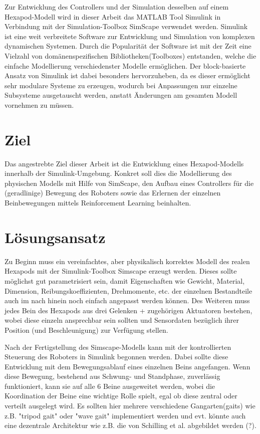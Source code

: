 Zur Entwicklung des Controllers und der Simulation desselben auf einem Hexapod-Modell wird in dieser Arbeit das MATLAB Tool Simulink in Verbindung mit der Simulation-Toolbox SimScape verwendet werden.
Simulink ist eine weit verbreitete Software zur Entwicklung und Simulation von komplexen dynamischen Systemen.
Durch die Popularität der Software ist mit der Zeit eine Vielzahl von domänenspezifischen Bibliotheken(Toolboxes) entstanden, welche die einfache Modellierung verschiedenster Modelle ermöglichen.
Der block-basierte Ansatz von Simulink ist dabei besonders hervorzuheben, da es dieser ermöglicht sehr modulare Systeme zu erzeugen, wodurch bei Anpassungen nur einzelne Subsysteme ausgetauscht werden, anstatt Änderungen am gesamten Modell vornehmen zu müssen.

\section{Ziel}
Das angestrebte Ziel dieser Arbeit ist die Entwicklung eines Hexapod-Modells innerhalb der Simulink-Umgebung.
Konkret soll dies die Modellierung des physischen Modells mit Hilfe von SimScape, den Aufbau eines Controllers für die (geradlinige) Bewegung des Roboters sowie das Erlernen der einzelnen Beinbewegungen mittels Reinforcement Learning beinhalten.

\section{Lösungsansatz}
Zu Beginn muss ein vereinfachtes, aber physikalisch korrektes Modell des realen Hexapods mit der Simulink-Toolbox Simscape erzeugt werden.
Dieses sollte möglichst gut parametrisiert sein, damit Eigenschaften wie Gewicht, Material, Dimension, Reibungskoeffizienten, Drehmomente, etc. der einzelnen Bestandteile auch im nach hinein noch einfach angepasst werden können.
Des Weiteren muss jedes Bein des Hexapods aus drei Gelenken + zugehörigen Aktuatoren bestehen, wobei diese einzeln ansprechbar sein sollten und Sensordaten bezüglich ihrer Position (und Beschleunigung) zur Verfügung stellen.

Nach der Fertigstellung des Simscape-Modells kann mit der kontrollierten Steuerung des Roboters in Simulink begonnen werden.
Dabei sollte diese Entwicklung mit dem Bewegungsablauf eines einzelnen Beins angefangen.
Wenn diese Bewegung, bestehend aus Schwung- und Standphase, zuverlässig funktioniert, kann sie auf alle 6 Beine ausgeweitet werden, wobei die Koordination der Beine eine wichtige Rolle spielt, egal ob diese zentral oder verteilt ausgelegt wird.
Es sollten hier mehrere verschiedene Gangarten(gaits) wie z.B. "tripod gait" oder "wave gait" implementiert werden und evt. könnte auch eine dezentrale Architektur wie z.B. die von Schilling et al. abgebildet werden (?).

